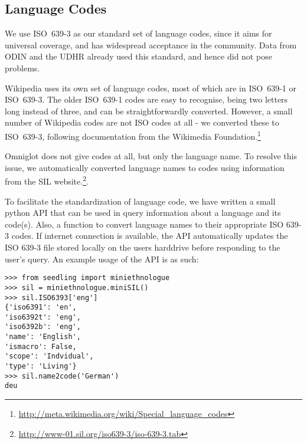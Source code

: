 
\subsection{Language Codes}
We use ISO~639-3 as our standard set of language codes, since it aims for universal coverage, and has widespread acceptance in the community. %
Data from ODIN and the UDHR already used this standard, and hence did not pose problems.

Wikipedia uses its own set of language codes, most of which are in ISO~639-1 or ISO~639-3.  The older ISO~639-1 codes are easy to recognise, being two letters long instead of three, and can be straightforwardly converted.  However, a small number of Wikipedia codes are not ISO codes at all - we converted these to ISO~639-3, following documentation from the Wikimedia Foundation.\footnote{\url{http://meta.wikimedia.org/wiki/Special_language_codes}}

Omniglot does not give codes at all, but only the language name. To resolve this issue, we automatically converted language names to codes using information from the SIL website.\footnote{\url{http://www-01.sil.org/iso639-3/iso-639-3.tab}}. 

To facilitate the standardization of language code, we have written a small python API that can be used in query information about a language and its code(s). Also, a function to convert language names to their appropriate ISO 639-3 codes. If internet connection is available, the API automatically updates the ISO 639-3 file stored locally on the users harddrive before responding to the user's query. An example usage of the API is as such:

\small\begin{verbatim}
>>> from seedling import miniethnologue
>>> sil = miniethnologue.miniSIL()
>>> sil.ISO6393['eng']
{'iso6391': 'en', 
'iso6392t': 'eng',
'iso6392b': 'eng',
'name': 'English', 
'ismacro': False, 
'scope': 'Indvidual', 
'type': 'Living'}
>>> sil.name2code('German')
deu
\end{verbatim}
\normalsize

